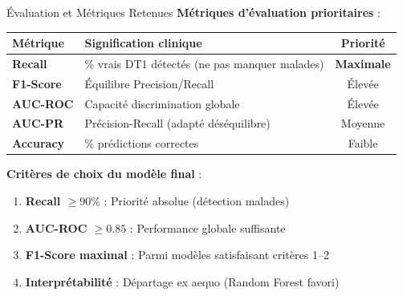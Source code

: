 \documentclass[11pt, aspectratio=169]{beamer}
\begin{document}
\begin{frame}{Évaluation et Métriques Retenues}
  \textbf{\color{accent2} Métriques d'évaluation prioritaires} :
  
  \vspace{0.6em}
  
  \begin{table}[h]
    \small
    \centering
    \begin{tabularx}{0.90\textwidth}{|l|X|c|}
      \toprule
      \textbf{Métrique} & \textbf{Signification clinique} & \textbf{Priorité} \\
      \midrule
      \textbf{Recall} & \% vrais DT1 détectés (ne pas manquer malades) & \textbf{Maximale} \\
      \textbf{F1-Score} & Équilibre Precision/Recall & Élevée \\
      \textbf{AUC-ROC} & Capacité discrimination globale & Élevée \\
      \textbf{AUC-PR} & Précision-Recall (adapté déséquilibre) & Moyenne \\
      \textbf{Accuracy} & \% prédictions correctes & Faible \\
      \bottomrule
    \end{tabularx}
  \end{table}
  
  \vspace{0.8em}
  
  \textbf{\color{accent2} Critères de choix du modèle final} :
  \begin{enumerate}
    \item \textbf{Recall $\geq 90\%$} : Priorité absolue (détection malades)
    \item \textbf{AUC-ROC $\geq 0.85$} : Performance globale suffisante
    \item \textbf{F1-Score maximal} : Parmi modèles satisfaisant critères 1--2
    \item \textbf{Interprétabilité} : Départage ex aequo (Random Forest favori)
  \end{enumerate}
\end{frame}
\end{document}
